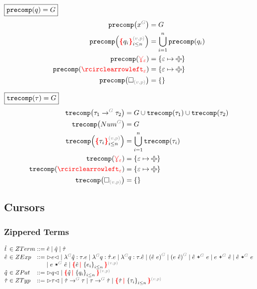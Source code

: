 \noindent $\boxed{\operatorname{\texttt{precomp}}\mathopen{}\left(q\right)\mathclose{} = G}$
%
\begin{align*}
  \precomp{\pVar{G}{x}} &= G
  \\
  \precomp{\conflictHole[i \leq n]{q_i}{v}{p}} &= \bigcup_{i=1}^n \precomp{q_i}
  \\
  \precomp{\multiVertex{\e}} &= \SetOf{\e \mapsto \Plus}
  \\
  \precomp{\cycleVertex{\e}} &= \SetOf{\e \mapsto \Plus}
  \\
  \precomp{\emptyHole{v}{p}} &= \SetOf{}
\end{align*}

\noindent $\boxed{\operatorname{\texttt{trecomp}}\mathopen{}\left(\tau\right)\mathclose{} = G}$
%
\begin{align*}
  \trecomp{\tArrow{G}{\tau_1}{\tau_2}}
    &= G \cup \trecomp{\tau_1} \cup \trecomp{\tau_2}
  \\
  \trecomp{\tNum{G}} &= G
  \\
  \trecomp{\conflictHole[i \leq n]{\tau_i}{v}{p}} &= \bigcup_{i=1}^n \trecomp{\tau_i}
  \\
  \trecomp{\multiVertex{\e}} &= \SetOf{\e \mapsto \Plus}
  \\
  \trecomp{\cycleVertex{\e}} &= \SetOf{\e \mapsto \Plus}
  \\
  \trecomp{\emptyHole{v}{p}} &= \SetOf{}
\end{align*}


\subsection{Cursors}


\subsubsection{Zippered Terms}

\[
  \arraycolsep=0pt
  \begin{array}{lcllll}
    \Z{t} & {}\in{} & ZTerm & {}::={} &
      \Z{e}
      \mid \Z{q}
      \mid \Z{\tau}
    \\
    \Z{e} & {}\in{} & ZExp & {}::={} &
      \cursor{e}
      \mid \eFun{G}{\Z{q}}{\tau}{e}
      \mid \eFun{G}{q}{\Z{\tau}}{e}
      \mid \eFun{G}{q}{\tau}{\Z{e}}
      \mid \eApp{G}{\Z{e}}{e}
      \mid \eApp{G}{e}{\Z{e}}
      \mid \ePlus{G}{\Z{e}}{e}
      \mid \ePlus{G}{e}{\Z{e}}
      \mid \eTimes{G}{\Z{e}}{e}
      \\
    &&&&
      \mid \eTimes{G}{e}{\Z{e}}
      \mid \conflictHole{\Z{e}, \SetOf{e_i}_{i \leq n}}{v}{p}
    \\
    \Z{q} & {}\in{} & ZPat & {}::={} &
      \cursor{q}
      \mid \conflictHole{\Z{q}, \SetOf{q_i}_{i \leq n}}{v}{p}
    \\
    \Z{\tau} & {}\in{} & ZTyp & {}::={} &
      \cursor{\tau}
      \mid \tArrow{G}{\Z{\tau}}{\tau}
      \mid \tArrow{G}{\tau}{\Z{\tau}}
      \mid \conflictHole{\Z{\tau}, \SetOf{\tau_i}_{i \leq n}}{v}{p}
    \\
  \end{array}
\]

